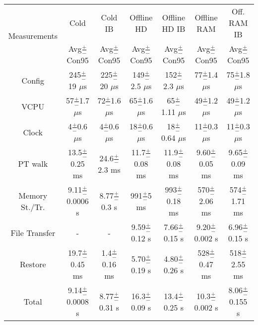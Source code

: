 \documentclass[border=0pt]{standalone}
\begin{document}
	
	\begin{tabular}{|c|c|c|c|c|c|c|}
		\hline
		\multirow{2}{*}{Measurements} & Cold & Cold IB & Offline HD & Offline HD IB & Offline RAM & Off. RAM IB \\
		\cline{2-7}
		& Avg$\frac{+}{-}$Con95 & Avg$\frac{+}{-}$Con95 & Avg$\frac{+}{-}$Con95 & Avg$\frac{+}{-}$Con95 & Avg$\frac{+}{-}$Con95 & Avg$\frac{+}{-}$Con95 \\
		\hline
		Config & 245$\frac{+}{-}$19 $\mu$s  & 225$\frac{+}{-}$20 $\mu$s & 149$\frac{+}{-}$2.5 $\mu$s & 152$\frac{+}{-}$2.3 $\mu$s & 77$\frac{+}{-}$1.4 $\mu$s & 75$\frac{+}{-}$1.8 $\mu$s  \\
		\hline
		VCPU & 57$\frac{+}{-}$1.7 $\mu$s  & 72$\frac{+}{-}$1.6 $\mu$s & 65$\frac{+}{-}$1.6 $\mu$s  & 65$\frac{+}{-}$1.11 $\mu$s & 49$\frac{+}{-}$1.2 $\mu$s & 49$\frac{+}{-}$1.2 $\mu$s   \\
		\hline
		Clock & 4$\frac{+}{-}$0.6 $\mu$s & 4$\frac{+}{-}$0.6 $\mu$s & 18$\frac{+}{-}$0.6 $\mu$s  & 18$\frac{+}{-}$0.64 $\mu$s & 11$\frac{+}{-}$0.3 $\mu$s & 11$\frac{+}{-}$0.3 $\mu$s  \\
		\hline
		PT walk & 13.5$\frac{+}{-}$0.25 ms & 24.6$\frac{+}{-}$2.3 ms & 11.7$\frac{+}{-}$0.08 ms & 11.9$\frac{+}{-}$0.08 ms & 9.60$\frac{+}{-}$0.05 ms & 9.65$\frac{+}{-}$0.09 ms  \\
		\hline
		Memory St./Tr. & 9.11$\frac{+}{-}$0.0006 s & 8.77$\frac{+}{-}$0.3 s & 991$\frac{+}{-}$5 ms & 993$\frac{+}{-}$0.18 ms & 570$\frac{+}{-}$2.06 ms & 574$\frac{+}{-}$1.71 ms \\
		\hline
		File Transfer & - & -  & 9.59$\frac{+}{-}$0.12 s & 7.66$\frac{+}{-}$0.15 s & 9.20$\frac{+}{-}$0.002 s & 6.96$\frac{+}{-}$0.15 s  \\
		\hline
		Restore & 19.7$\frac{+}{-}$0.45 ms & 1.4$\frac{+}{-}$0.16 ms & 5.70$\frac{+}{-}$0.19 s & 4.80$\frac{+}{-}$0.26 s & 528$\frac{+}{-}$0.47 ms & 518$\frac{+}{-}$2.55 ms  \\
		\hline
		Total & 9.14$\frac{+}{-}$0.0008 s & 8.77$\frac{+}{-}$0.31 s & 16.3$\frac{+}{-}$0.09 s & 13.4$\frac{+}{-}$0.25 s & 10.3$\frac{+}{-}$0.002 s & 8.06$\frac{+}{-}$0.155 s  \\
		\hline
		
	\end{tabular}
\end{document}
